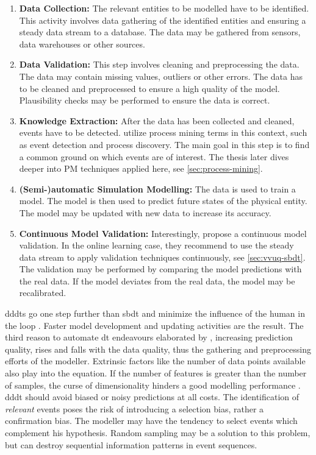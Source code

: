 \begin{enumerate}
  \item \textbf{Data Collection:} The relevant entities to be modelled have to be identified. This activity involves data gathering of the identified entities and ensuring a steady data stream to a database. The data may be gathered from sensors, data warehouses or other sources.
  \item \textbf{Data Validation:} This step involves cleaning and preprocessing the data. The data may contain missing values, outliers or other errors. The data has to be cleaned and preprocessed to ensure a high quality of the model. Plausibility checks may be performed to ensure the data is correct.
  \item \textbf{Knowledge Extraction:} After the data has been collected and cleaned, events have to be detected.  utilize process mining terms in this context, such as event detection and process discovery. The main goal in this step is to find a common ground on which events are of interest. The thesis later dives deeper into PM techniques applied here, see \autoref{sec:process-mining}.
  \item \textbf{(Semi-)automatic Simulation Modelling:} The data is used to train a model. The model is then used to predict future states of the physical entity. The model may be updated with new data to increase its accuracy.
  \item \textbf{Continuous Model Validation:} Interestingly, \citeauthor{francis2021towards} propose a continuous model validation. In the online learning case, they recommend to use the steady data stream to apply validation techniques continuously, see \autoref{sec:vvuq-sbdt}. The validation may be performed by comparing the model predictions with the real data. If the model deviates from the real data, the model may be recalibrated.
\end{enumerate}

\gls{dddt}s go one step further than \gls{sbdt} and minimize the influence of the human in the loop \autocite{francis2021towards,Friederich2022}. Faster model development and updating activities are the result. The third reason to automate \gls{dt} endeavours elaborated by \textcite{Schwede2024}, increasing prediction quality, rises and falls with the data quality, thus the gathering and preprocessing efforts of the modeller. Extrinsic factors like the number of data points available also play into the equation. If the number of features is greater than the number of samples, the curse of dimensionality hinders a good modelling performance \autocite{koppen2000curse}. \gls{dddt} should avoid biased or noisy predictions at all costs. The identification of \textit{relevant} events poses the risk of introducing a selection bias, rather a confirmation bias. The modeller may have the tendency to select events which complement his hypothesis. Random sampling may be a solution to this problem, but can destroy sequential information patterns in event sequences.

